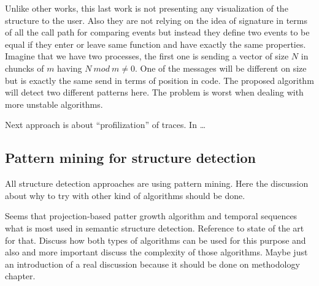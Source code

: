 Unlike other works, this last work is not presenting any visualization of the
structure to the user. Also they are not relying on the idea of signature in
terms of all the call path for comparing events but instead they define two 
events to be equal if they enter or leave same function and have exactly the
same properties. Imagine that we have two processes, the first one is sending a
vector of size $N$ in chuncks of $m$ having $N\:mod\: m \neq 0$. One of the messages
will be different on size but is exactly the same send in terms of position in
code. The proposed algorithm will detect two different patterns here. The
problem is worst when dealing with more unstable algorithms.

Next approach is about “profilization” of traces.
In \cite{saviankou2015cube} 
\dots


\subsection{Pattern mining for structure detection}


All structure detection approaches are using pattern mining. Here the discussion
about why to try with other kind of algorithms should be done.

Seems that projection-based patter growth algorithm and temporal sequences what 
is most used in
semantic structure detection. Reference to state of the art for that. Discuss
how both types of algorithms can be used for this purpose and also and more
important discuss the complexity of those algorithms. Maybe just an introduction
of a real discussion because it should be done on methodology chapter.


